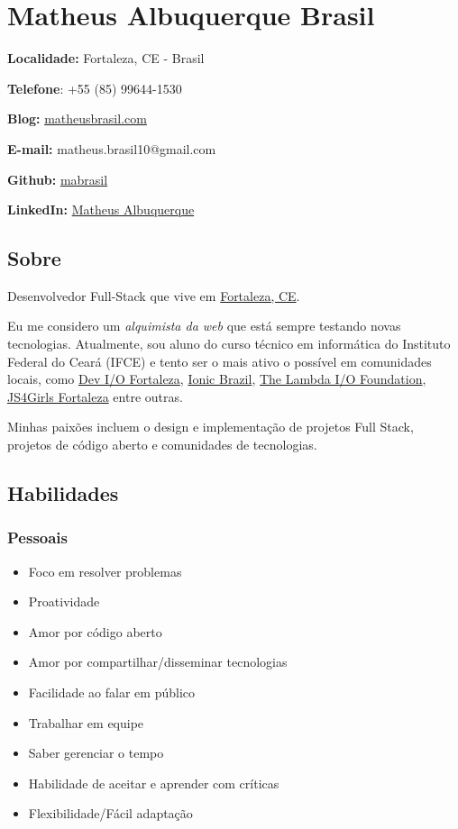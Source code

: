 \documentclass[]{article}
\date{}
\providecommand{\tightlist}{%
  \setlength{\itemsep}{0pt}\setlength{\parskip}{0pt}}
\begin{document}
\section{Matheus Albuquerque Brasil}\label{matheus-albuquerque-brasil}

\textbf{Localidade:} Fortaleza, CE - Brasil

\textbf{Telefone}: +55 (85) 99644-1530

\textbf{Blog:} \href{http://matheusbrasil.com}{matheusbrasil.com}

\textbf{E-mail:} matheus.brasil10@gmail.com

\textbf{Github:} \href{https://github.com/mabrasil}{mabrasil}

\textbf{LinkedIn:}
\href{https://www.linkedin.com/in/matheusalbuquerque}{Matheus
Albuquerque}

\subsection{Sobre}\label{sobre}

Desenvolvedor Full-Stack que vive em
\href{http://pt.wikipedia.org/wiki/Fortaleza}{Fortaleza, CE}.

Eu me considero um \emph{alquimista da web} que está sempre testando
novas tecnologias. Atualmente, sou aluno do curso técnico em informática
do Instituto Federal do Ceará (IFCE) e tento ser o mais ativo o possível
em comunidades locais, como
\href{https://www.facebook.com/groups/fortalezadevelopers/}{Dev I/O
Fortaleza}, \href{http://ionicbrazil.com/}{Ionic Brazil},
\href{https://github.com/lambda-io}{The Lambda I/O Foundation},
\href{http://js4girls-fortaleza.github.io/}{JS4Girls Fortaleza} entre
outras.

Minhas paixões incluem o design e implementação de projetos Full Stack,
projetos de código aberto e comunidades de tecnologias.

\subsection{Habilidades}\label{habilidades}

\subsubsection{Pessoais}\label{pessoais}

\begin{itemize}
\tightlist
\item
  Foco em resolver problemas
\item
  Proatividade
\item
  Amor por código aberto
\item
  Amor por compartilhar/disseminar tecnologias
\item
  Facilidade ao falar em público
\item
  Trabalhar em equipe
\item
  Saber gerenciar o tempo
\item
  Habilidade de aceitar e aprender com críticas
\item
  Flexibilidade/Fácil adaptação
\end{itemize}
\end{document}
